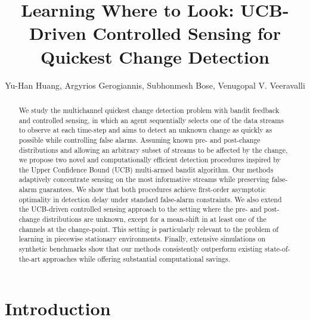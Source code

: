 \documentclass[letterpaper, 10 pt, conference]{ieeeconf}  %
\title{\LARGE \bf
Learning Where to Look: UCB-Driven Controlled Sensing for Quickest Change Detection
}
\author{Yu-Han Huang, Argyrios Gerogiannis, Subhonmesh Bose, Venugopal V. Veeravalli}
\begin{document}
\maketitle
\thispagestyle{empty}
\pagestyle{empty}


\begin{abstract}

We study the multichannel quickest change detection problem with bandit feedback and controlled sensing, in which an agent sequentially selects one of the data streams to observe at each time-step and aims to detect an unknown change as quickly as possible while controlling false alarms. Assuming known pre- and post-change distributions and allowing an arbitrary subset of streams to be affected by the change, we propose two novel and computationally efficient detection procedures inspired by the Upper Confidence Bound (UCB) multi-armed bandit algorithm. Our methods adaptively concentrate sensing on the most informative streams while preserving false-alarm guarantees. We show that both procedures achieve first-order asymptotic optimality in detection delay under standard false-alarm constraints. We also extend the UCB-driven controlled sensing approach to the setting where the pre- and post-change distributions are unknown, except for a  mean-shift in at least one of the channels at the change-point.  This setting is particularly relevant to the problem of learning in piecewise stationary environments. Finally, extensive simulations on synthetic benchmarks show that our methods consistently outperform existing state-of-the-art approaches while offering substantial computational savings.

  
\end{abstract}

\section{Introduction}
\end{document}
